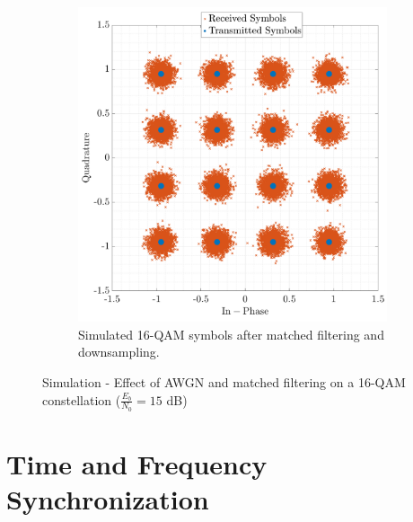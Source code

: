 \documentclass[11pt]{article}
\begin{document}
\begin{figure}[H]
\begin{subfigure}{0.48\textwidth}
			\includegraphics[width=\linewidth]{Images/const-filtered-down.png}      
			\caption{Simulated 16-QAM symbols after matched filtering and downsampling.}
			\label{fig:const-filtered-down_cont}
		\end{subfigure}
		\caption{Simulation - Effect of AWGN and matched filtering on a 16-QAM constellation ($\frac{E_b}{N_0} = 15$ dB)}
		\label{fig:constellations-noise_cont}
	\end{figure}
	
	\section{Time and Frequency Synchronization}
\end{document}
